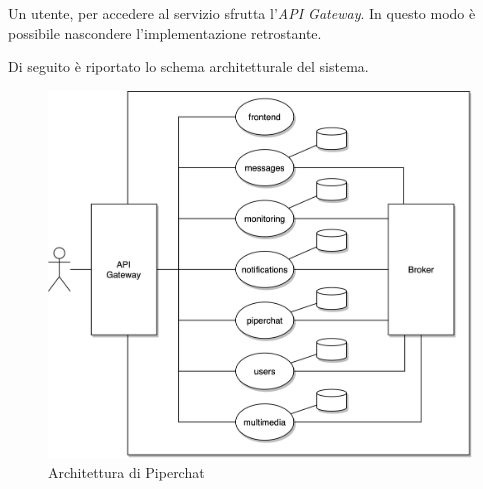 Un utente, per accedere al servizio sfrutta l'\emph{API Gateway}.
In questo modo è possibile nascondere l'implementazione retrostante.

Di seguito è riportato lo schema architetturale del sistema.

\begin{figure}[H]
    \centering
    \includegraphics[width=\textwidth]{sections/03-design/img/piperchat-microservizi.jpg}
    \caption{Architettura di Piperchat}
    \label{fig:piperchat-architecture}
\end{figure}
